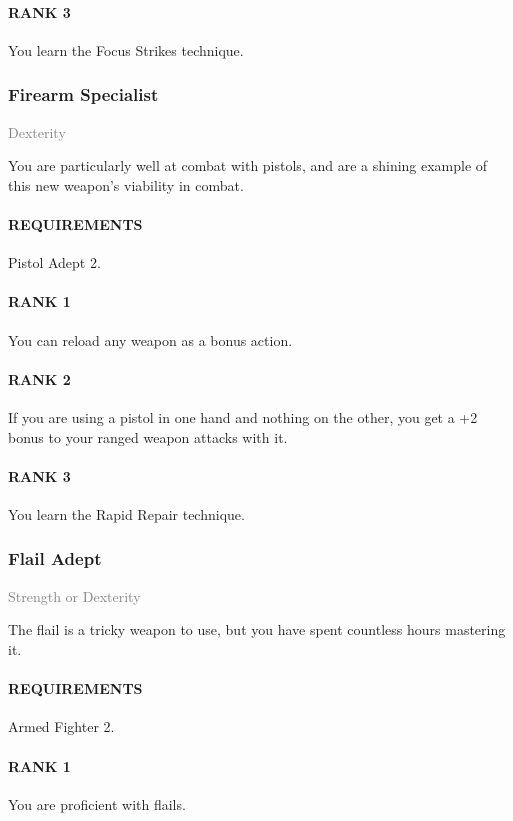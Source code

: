 \paragraph{RANK 3} You learn the Focus Strikes technique.

\subsubsection{Firearm Specialist} \label{feat::firearmspecialist}
\small{\textcolor{gray}{Dexterity}}

\normalsize
You are particularly well at combat with pistols, and are a shining example of this new weapon's viability in combat.
\paragraph{REQUIREMENTS} Pistol Adept 2.
\paragraph{RANK 1} You can reload any weapon as a bonus action.
\paragraph{RANK 2} If you are using a pistol in one hand and nothing on the other, you get a +2 bonus to your ranged weapon attacks with it.
\paragraph{RANK 3} You learn the Rapid Repair technique.

\subsubsection{Flail Adept} \label{feat::flailadept}
\small{\textcolor{gray}{Strength or Dexterity}}

\normalsize
The flail is a tricky weapon to use, but you have spent countless hours mastering it.
\paragraph{REQUIREMENTS} Armed Fighter 2.
\paragraph{RANK 1} You are proficient with flails.
